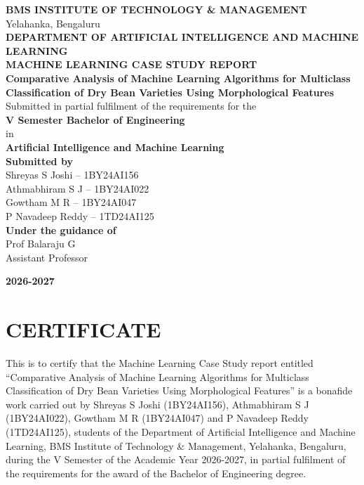 
\begin{titlepage}
\begin{center}
{\bfseries\large BMS INSTITUTE OF TECHNOLOGY \& MANAGEMENT}\\[0.15cm]
Yelahanka, Bengaluru\\[0.45cm]
{\bfseries DEPARTMENT OF ARTIFICIAL INTELLIGENCE AND MACHINE LEARNING}\\[2.2cm]
{\bfseries\large MACHINE LEARNING CASE STUDY REPORT}\\[1.2cm]
{\bfseries\Large Comparative Analysis of Machine Learning Algorithms for
Multiclass Classification of Dry Bean Varieties Using Morphological
Features}\\[1.6cm]
Submitted in partial fulfilment of the requirements for the\\[0.25cm]
{\bfseries V Semester Bachelor of Engineering}\\[0.15cm]
in\\[0.15cm]
{\bfseries Artificial Intelligence and Machine Learning}\\[1.4cm]
{\bfseries Submitted by}\\[0.25cm]
Shreyas S Joshi -- 1BY24AI156\\[0.1cm]
Athmabhiram S J -- 1BY24AI022\\[0.1cm]
Gowtham M R -- 1BY24AI047\\[0.1cm]
P Navadeep Reddy -- 1TD24AI125\\[1.4cm]
{\bfseries Under the guidance of}\\[0.25cm]
Prof Balaraju G\\[0.1cm]
Assistant Professor
\par\vfill
{\bfseries 2026-2027}
\end{center}
\end{titlepage}

\chapter*{CERTIFICATE}
\thispagestyle{frontmatter}

This is to certify that the Machine Learning Case Study report entitled
``Comparative Analysis of Machine Learning Algorithms for Multiclass
Classification of Dry Bean Varieties Using Morphological Features'' is a
bonafide work carried out by Shreyas S Joshi (1BY24AI156), Athmabhiram S J
(1BY24AI022), Gowtham M R (1BY24AI047) and P Navadeep Reddy (1TD24AI125),
students of the Department of Artificial Intelligence and Machine Learning, BMS
Institute of Technology \& Management, Yelahanka, Bengaluru, during the V
Semester of the Academic Year 2026-2027, in partial fulfilment of the requirements
for the award of the Bachelor of Engineering degree.

